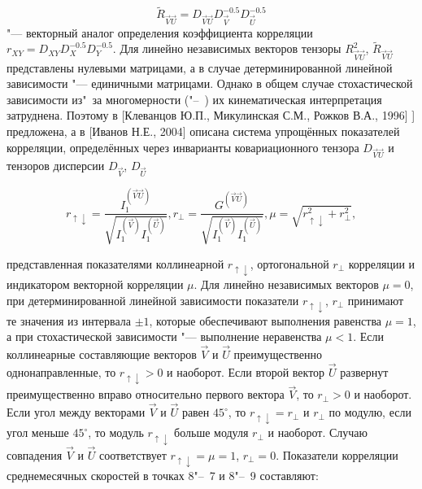 \begin{equation}
\label{eq:equation3_24}
{\tilde{R}_{\vec{V}\vec{U}}=D_{\vec{V}\vec{U}}D^{-0.5}_{\vec{V}}D^{-0.5}_{\vec{U}}}
\end{equation} 
"--- векторный аналог определения коэффициента корреляции $r_{XY}=D_{XY}D^{-0.5}_{X}D^{-0.5}_{Y}$. 
Для линейно независимых векторов тензоры $R^{2}_{\vec{V}\vec{U}}$, $\tilde{R}_{\vec{V}\vec{U}}$ представлены нулевыми матрицами, а в случае детерминированной линейной зависимости "--- единичными матрицами. 
Однако в общем случае стохастической зависимости из"~за многомерности ("--~) их кинематическая интерпретация затруднена. Поэтому в [Клеванцов Ю.П., Микулинская С.М., Рожков В.А., 1996] ] предложена, а в [Иванов Н.Е., 2004] описана система упрощённых показателей корреляции, определённых через инварианты ковариационного тензора $D_{\vec{V}\vec{U}}$ и тензоров дисперсии $D_{\vec{V}}$, $D_{\vec{U}}$
		
\begin{equation}
\label{eq:equation3_25}
{r_{\uparrow\downarrow}=\frac{I^{(\vec{V}\vec{U})}_{1}}{\sqrt{I^{(\vec{V})}_{1}I^{(\vec{U})}_{1}}}, r_{\perp}=\frac{G^{(\vec{V}\vec{U})}}{\sqrt{I^{(\vec{V})}_{1}I^{(\vec{U})}_{1}}}, \mu=\sqrt{r^{2}_{\uparrow\downarrow}+r^{2}_{\perp}}},
\end{equation} 		

представленная показателями коллинеарной $r_{\uparrow\downarrow}$, ортогональной $r_{\perp}$ корреляции и индикатором векторной корреляции $\mu$. Для линейно независимых векторов $\mu=0$, при детерминированной линейной зависимости показатели $r_{\uparrow\downarrow}$, $r_{\perp}$ принимают те значения из интервала $\pm1$, которые обеспечивают выполнения равенства $\mu=1$, а при стохастической зависимости "--- выполнение неравенства $\mu<1$. Если коллинеарные составляющие векторов $\vec{V}$ и $\vec{U}$ преимущественно однонаправленные, то $r_{\uparrow\downarrow}>0$ и наоборот. Если второй вектор $\vec{U}$ развернут преимущественно вправо относительно первого вектора $\vec{V}$, то $r_{\perp}>0$ и наоборот. Если угол между векторами $\vec{V}$ и $\vec{U}$ равен $45^{\circ}$, то $r_{\uparrow\downarrow}=r_{\perp}$ и $r_{\perp}$ по модулю, если угол меньше $45^{\circ}$, то модуль $r_{\uparrow\downarrow}$ больше модуля $r_{\perp}$ и наоборот. Случаю совпадения $\vec{V}$ и $\vec{U}$ соответствует $r_{\uparrow\downarrow}=\mu=1$, $r_{\perp}=0$.
Показатели корреляции среднемесячных скоростей в точках 8"--~7 и 8"--~9 составляют:

